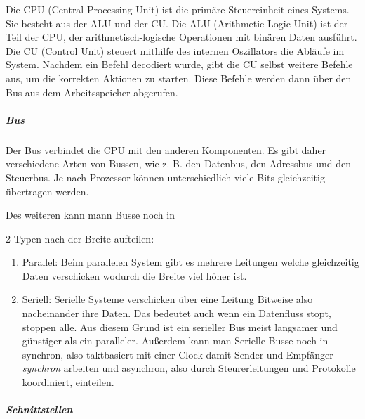 \documentclass[
    headings=optiontotocandhead,%
    twoside,
    numbers=noenddot,%
    12pt, %
    titlepage, %
    parskip=full, %
    listof=leveldown, 
    numbers=noenddot, %
    a4paper,DIV=14,
    BCOR=15mm,
]{scrbook}
\providecommand{\tightlist}{%
  \setlength{\itemsep}{0pt}\setlength{\parskip}{0pt}}
\begin{document}
Die CPU (Central Processing Unit) ist die primäre Steuereinheit eines
Systems. Sie besteht aus der ALU und der CU. Die ALU (Arithmetic Logic
Unit) ist der Teil der CPU, der arithmetisch-logische Operationen mit
binären Daten ausführt. Die CU (Control Unit) steuert mithilfe des
internen Oszillators die Abläufe im System. Nachdem ein Befehl decodiert
wurde, gibt die CU selbst weitere Befehle aus, um die korrekten Aktionen
zu starten. Diese Befehle werden dann über den Bus aus dem
Arbeitsspeicher abgerufen.

\hypertarget{bus}{%
\subparagraph{Bus}\label{bus}}

Der Bus verbindet die CPU mit den anderen Komponenten. Es gibt daher
verschiedene Arten von Bussen, wie z. B. den Datenbus, den Adressbus und
den Steuerbus. Je nach Prozessor können unterschiedlich viele Bits
gleichzeitig übertragen werden.

Des weiteren kann mann Busse noch in

2 Typen nach der Breite aufteilen:

\begin{enumerate}
\def\labelenumi{\arabic{enumi}.}
\tightlist
\item
  Parallel: Beim parallelen System gibt es mehrere Leitungen welche
  gleichzeitig Daten verschicken wodurch die Breite viel höher ist.
\item
  Seriell: Serielle Systeme verschicken über eine Leitung Bitweise also
  nacheinander ihre Daten. Das bedeutet auch wenn ein Datenfluss stopt,
  stoppen alle. Aus diesem Grund ist ein serieller Bus meist langsamer
  und günstiger als ein paralleler. Außerdem kann man Serielle Busse
  noch in synchron, also taktbasiert mit einer Clock damit Sender und
  Empfänger \emph{synchron} arbeiten und asynchron, also durch
  Steurerleitungen und Protokolle koordiniert, einteilen.
\end{enumerate}

\hypertarget{schnittstellen}{%
\subparagraph{Schnittstellen}\label{schnittstellen}}
\end{document}
